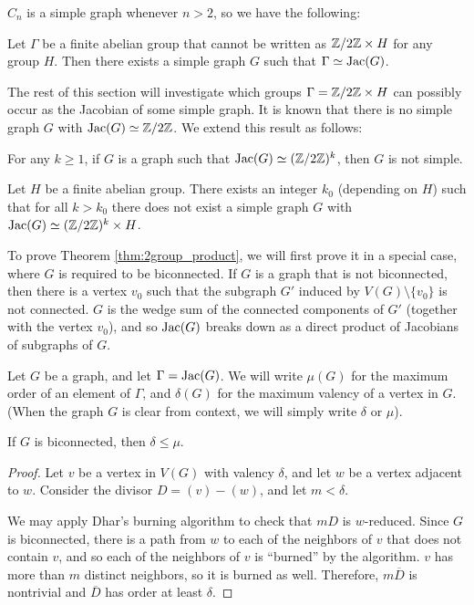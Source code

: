 \documentclass{amsart}
\begin{document}
$C_n$ is a simple graph whenever $n > 2$, so we have the following:

\begin{cor}
  Let $\Gamma$ be a finite abelian group that cannot be written as
  $\mathbb{Z}/2\mathbb{Z} \times H$ for any group $H$. Then there exists a simple
  graph $G$ such that $\Gamma \simeq \operatorname{Jac}(G)$.
\end{cor}

The rest of this section will investigate which groups $\Gamma =
\mathbb{Z}/2\mathbb{Z} \times H$ can possibly occur as the Jacobian of some simple
graph. It is known that there is no simple graph $G$ with $\operatorname{Jac}(G)
\simeq \mathbb{Z}/2\mathbb{Z}$. We extend this result as follows:

\begin{thm}
  \label{thm:2group}
  For any $k \ge 1$, if $G$ is a graph such that $\operatorname{Jac}(G) \simeq
  (\mathbb{Z}/2\mathbb{Z})^k$, then $G$ is not simple.
\end{thm}

\begin{thm}
  \label{thm:2group_product}
  Let $H$ be a finite abelian group. There exists an integer $k_0$
  (depending on $H$) such that for all $k > k_0$ there does not exist
  a simple graph $G$ with $\operatorname{Jac}(G) \simeq (\mathbb{Z}/2\mathbb{Z})^k \times H$.
\end{thm}

To prove Theorem \ref{thm:2group_product}, we will first prove it in a
special case, where $G$ is required to be biconnected. If $G$ is a
graph that is not biconnected, then there is a vertex $v_0$ such that
the subgraph $G'$ induced by $V(G) \setminus \{v_0\}$ is not
connected. $G$ is the wedge sum of the connected components of $G'$
(together with the vertex $v_0$), and so $\operatorname{Jac}(G)$ breaks down as a
direct product of Jacobians of subgraphs of $G$.

\begin{defn}
  Let $G$ be a graph, and let $\Gamma = \operatorname{Jac}(G)$. We will write $\mu(G)$
  for the maximum order of an element of $\Gamma$, and $\delta(G)$ for
  the maximum valency of a vertex in $G$. (When the graph $G$ is clear
  from context, we will simply write $\delta$ or $\mu$). 
\end{defn}

\begin{lem}
  \label{lem:delta_le_mu}
  If $G$ is biconnected, then $\delta \le \mu$.
\end{lem}
\begin{proof}
  Let $v$ be a vertex in $V(G)$ with valency $\delta$, and let $w$ be
  a vertex adjacent to $w$. Consider the divisor $D = (v) -
  (w)$, and let $m < \delta$. 

  We may apply Dhar's burning algorithm to check that $mD$ is
  $w$-reduced. Since $G$ is biconnected, there is a path from $w$ to
  each of the neighbors of $v$ that does not contain $v$, and so each
  of the neighbors of $v$ is ``burned'' by the algorithm. $v$ has more
  than $m$ distinct neighbors, so it is burned as well. Therefore,
  $m\overline{D}$ is nontrivial and $\overline{D}$ has order at least
  $\delta$.
\end{proof}
\end{document}

